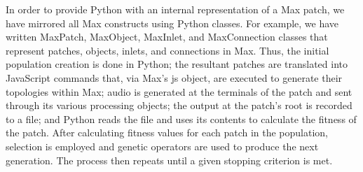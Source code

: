 \documentclass[12pt]{report} 	%
\numberwithin{figure}{chapter}
\numberwithin{table}{chapter}
\numberwithin{equation}{chapter}
\begin{document}
\begin{flushleft}
In order to provide Python with an internal representation of a Max patch, we have mirrored all Max constructs using Python classes. For example, we have written MaxPatch, MaxObject, MaxInlet, and MaxConnection classes that represent patches, objects, inlets, and connections in Max. Thus, the initial population creation is done in Python; the resultant patches are translated into JavaScript commands that, via Max's js object, are executed to generate their topologies within Max; audio is generated at the terminals of the patch and sent through its various processing objects; the output at the patch's root is recorded to a file; and Python reads the file and uses its contents to calculate the fitness of the patch. After calculating fitness values for each patch in the population, selection is employed and genetic operators are used to produce the next generation. The process then repeats until a given stopping criterion is met.


\end{flushleft}
\end{document}

